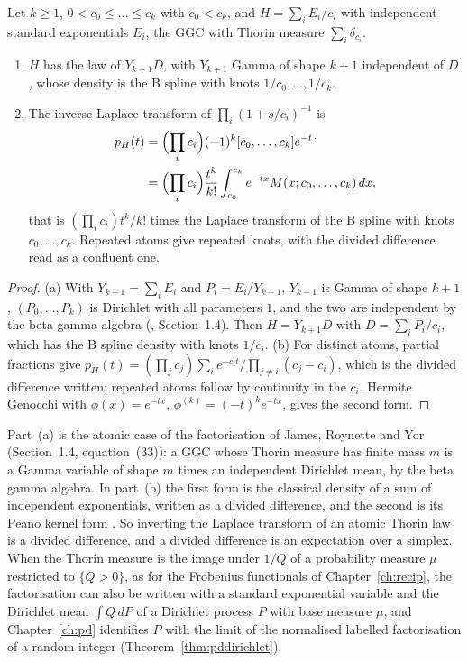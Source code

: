 \begin{theorem}\label{thm:lapspline}
Let $k\ge1$, $0<c_0\le\dots\le c_k$ with $c_0<c_k$, and $H=\sum_iE_i/c_i$ with independent standard exponentials $E_i$, the GGC with Thorin measure $\sum_i\delta_{c_i}$.
\begin{enumerate}
\item[(a)] $H$ has the law of $Y_{k+1}D$, with $Y_{k+1}$ Gamma of shape $k+1$ independent of $D$, whose density is the B spline with knots $1/c_0,\dots,1/c_k$.
\item[(b)] The inverse Laplace transform of $\prod_i(1+s/c_i)^{-1}$ is
\begin{align*}
p_H(t)&=\Bigl(\prod_ic_i\Bigr)(-1)^k[c_0,\dots,c_k]e^{-t\,\cdot}\\
&=\Bigl(\prod_ic_i\Bigr)\frac{t^k}{k!}\int_{c_0}^{c_k}e^{-tx}M(x;c_0,\dots,c_k)\,dx,
\end{align*}
that is $(\prod_ic_i)t^k/k!$ times the Laplace transform of the B spline with knots $c_0,\dots,c_k$. Repeated atoms give repeated knots, with the divided difference read as a confluent one.
\end{enumerate}
\end{theorem}

\begin{proof}
(a) With $Y_{k+1}=\sum_iE_i$ and $P_i=E_i/Y_{k+1}$, $Y_{k+1}$ is Gamma of shape $k+1$, $(P_0,\dots,P_k)$ is Dirichlet with all parameters $1$, and the two are independent by the beta gamma algebra (\cite{jamesroynetteyor2008}, Section~1.4). Then $H=Y_{k+1}D$ with $D=\sum_iP_i/c_i$, which has the B spline density with knots $1/c_i$. (b) For distinct atoms, partial fractions give $p_H(t)=(\prod_jc_j)\sum_ie^{-c_it}/\prod_{j\ne i}(c_j-c_i)$, which is the divided difference written; repeated atoms follow by continuity in the $c_i$. Hermite Genocchi with $\phi(x)=e^{-tx}$, $\phi^{(k)}=(-t)^ke^{-tx}$, gives the second form.
\end{proof}

Part~(a) is the atomic case of the factorisation of James, Roynette and Yor \cite{jamesroynetteyor2008} (Section~1.4, equation~(33)): a GGC whose Thorin measure has finite mass $m$ is a Gamma variable of shape $m$ times an independent Dirichlet mean, by the beta gamma algebra. In part~(b) the first form is the classical density of a sum of independent exponentials, written as a divided difference, and the second is its Peano kernel form \cite{deboor2005}. So inverting the Laplace transform of an atomic Thorin law is a divided difference, and a divided difference is an expectation over a simplex. When the Thorin measure is the image under $1/Q$ of a probability measure $\mu$ restricted to $\{Q>0\}$, as for the Frobenius functionals of Chapter~\ref{ch:recip}, the factorisation can also be written with a standard exponential variable and the Dirichlet mean $\int Q\,dP$ of a Dirichlet process $P$ with base measure $\mu$, and Chapter~\ref{ch:pd} identifies $P$ with the limit of the normalised labelled factorisation of a random integer (Theorem~\ref{thm:pddirichlet}).

